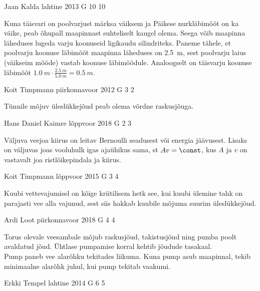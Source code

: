 \documentclass[11pt, twoside]{article}
\begin{document}
{%
{Jaan Kalda} %
{lahtine} %
{2013} %
{G 10} %
{10} %
{

\ifHint
Kuna täisvari on poolvarjust märksa väiksem ja Päikese nurkläbimõõt on ka väike, peab õhupall maapinnast suhteliselt kaugel olema. Seega võib maapinna läheduses lugeda varju koonuseid ligikaudu silindriteks. Paneme tähele, et poolvarju koonuse läbimõõt maapinna läheduses on \SI{2,5}{m}, sest poolvarju laius (väikseim mõõde) vastab koonuse läbimõõdule. Analoogselt on täisvarju koonuse läbimõõt $\SI{1,0}{m}\cdot\frac{\SI{2,5}{m}}{\SI{5,0}{m}} = \SI{0,5}{m}$.
\fi
}

{Koit Timpmann} %
{piirkonnavoor} %
{2012} %
{G 3} %
{2} %
{

\ifHint
Tünnile mõjuv üleslükkejõud peab olema võrdne raskusjõuga.
\fi
}

{Hans Daniel Kaimre} %
{lõppvoor} %
{2018} %
{G 2} %
{3} %
{

\ifHint
Väljuva veejoa kiirus on leitav Bernoulli seadusest või energia jäävusest. Lisaks on väljuvas joas vooluhulk igas ajaühikus sama, st $Av = \const$, kus $A$ ja $v$ on vastavalt joa ristlõikepindala ja kiirus.
\fi
}

{Koit Timpmann} %
{lõppvoor} %
{2015} %
{G 3} %
{4} %
{

\ifHint
Kuubi vettevajumisel on kõige kriitilisem hetk see, kui kuubi ülemine tahk on parajasti vee alla vajunud, sest siis hakkab kuubile mõjuma suurim üleslükkejõud.
\fi
}

{Ardi Loot} %
{piirkonnavoor} %
{2018} %
{G 4} %
{4} %
{

\ifHint
\osa Torus olevale veesambale mõjub raskusjõud, takistusjõud ning pumba poolt avaldatud jõud. Ühtlase pumpamise korral kehtib jõudude tasakaal.\\
\osa Pump paneb vee alarõhku tekitades liikuma. Kuna pump asub maapinnal, tekib minimaalne alarõhk juhul, kui pump tekitab vaakumi.
\fi
}

{Erkki Tempel} %
{lahtine} %
{2014} %
{G 6} %
{5} %
{

}}
\end{document}

